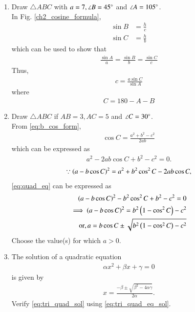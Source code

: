 \begin{enumerate}[label=\arabic*.,ref=\thesubsection.\theenumi]
\item Draw $\triangle ABC$ with $a = 7, \angle B = 45\degree$ and $\angle A = 105 \degree$. 
\\
\solution In Fig. \eqref{ch2_cosine_formula},	
\begin{align}
\label{eq:sin_form_def}
\sin B &= \frac{h}{c}
\\
\sin C &= \frac{h}{b}
\end{align}
%
which can be used to show that
\begin{align}
\label{eq:sin_form}
\frac{\sin A}{a}=\frac{\sin B}{b}=\frac{\sin C}{c}
\end{align}
%
Thus, 
\begin{align}
c = \frac{a\sin C}{\sin A}
\end{align}
where
\begin{align}
C = 180-A-B
\end{align}
\item Draw $\triangle ABC$ if $AB = 3, AC = 5$ and $\angle C = 30 \degree$.
%
\\
\solution From \eqref{eq:b_cos_form}, 
\begin{align}
\cos C = \frac{a^2+b^2-c^2}{2ab}
\end{align}
%
which can be expressed as
\begin{align}
\label{eq:quad_eq}
a^2 -2ab\cos C +b^2-c^2 = 0.
\end{align}
\begin{align}
\because \left(a-b\cos C\right)^2 = a^2+b^2\cos^2C -2ab\cos C,
\end{align}
\eqref{eq:quad_eq} can be expressed as 
\begin{align}
\left(a-b\cos C\right)^2 -b^2\cos^2C+b^2-c^2 = 0
\\
\implies \left(a-b\cos C\right)^2 = b^2\left(1-\cos^2C\right)-c^2
\\
\text{or}, a = b\cos C \pm \sqrt{b^2\left(1-\cos^2C\right)-c^2}
\label{eq:tri_quad_sol}
\end{align}
%
Choose the value(s) for which $a > 0$.
\item The solution of a quadratic equation
\begin{align}
\label{eq:tri_quad_eq}
\alpha x^2 + \beta x + \gamma = 0
\end{align}
is given by 
\begin{align}
\label{eq:tri_quad_eq_sol}
x = \frac{-\beta \pm \sqrt{\beta^2 - 4\alpha\gamma}}{2\alpha}.
\end{align}
Verify \eqref{eq:tri_quad_sol} using \eqref{eq:tri_quad_eq_sol}.



\end{enumerate}

